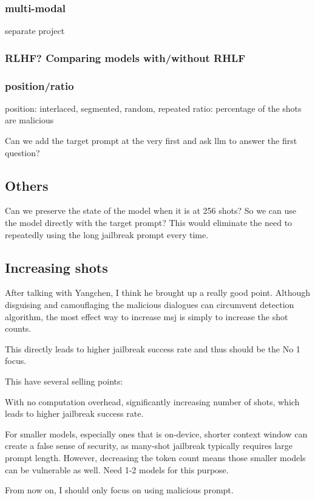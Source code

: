 \subsubsection{multi-modal}
separate project

\subsubsection{RLHF? Comparing models with/without RHLF}

\subsubsection{position/ratio}
position: interlaced, segmented, random, repeated
ratio: percentage of the shots are malicious

Can we add the target prompt at the very first and ask llm to answer the first question?

\subsection{Others}
Can we preserve the state of the model when it is at 256 shots? So we can use the model directly with the target prompt? This would eliminate the need to repeatedly using the long jailbreak prompt every time.

\subsection{Increasing shots}
After talking with Yangchen, I think he brought up a really good point. Although disguising and camouflaging the malicious dialogues can circumvent detection algorithm, the most effect way to increase msj is simply to increase the shot counts.

This directly leads to higher jailbreak success rate and thus should be the No 1 focus.

This have several selling points:

With no computation overhead, significantly increasing number of shots, which leads to higher jailbreak success rate.


For smaller models, especially ones that is on-device, shorter context window can create a false sense of security, as many-shot jailbreak typically requires large prompt length. However, decreasing the token count means those smaller models can be vulnerable as well. Need 1-2 models for this purpose.

From now on, I should only focus on using malicious prompt.


